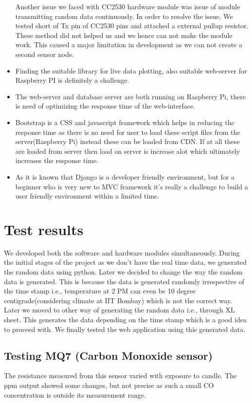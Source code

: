 \documentclass[a4paper,12pt]{article}
\begin{document}
\begin{itemize}
Another issue we faced with CC2530 hardware module was issue of module transmitting random data continuously. In order to resolve the issue, We tested short of Tx pin of CC2530 pins and attached a external pullup resistor. These method did not helped us and we hence can not make the module work. This caused a major limitation in development as we can not create a second sensor node.  



\item Finding the suitable library for live data plotting, also suitable web-server for Raspberry PI is definitely a challenge.
\item The web-server and database server are both running on Raspberry Pi, there is need of optimizing the response time of the web-interface.
\item Bootstrap is a CSS and javascript framework which helps in reducing the response time as there is no need for user to load these script files from the server(Raspberry Pi) instead these can be loaded from CDN. If at all these are loaded from server then load on server is increase alot which ultimately increases the response time.
\item As it is known that Django is a developer friendly environment, but for a beginner who is very new to MVC framework it's really a challenge to build a user friendly environment within a limited time.

\end{itemize}


\section{Test results}
\label{sec:Test_result}
We developed both the software and hardware modules simultaneously. During the initial stages of the project as we don't have the real time data, we generated the random data using python. Later we decided to change the way the random data is generated. This is because the data is generated randomly irrespective of the time stamp i.e., temperature at 2 PM can even be 10 degree centigrade(considering climate at IIT Bombay) which is not the correct way. Later we moved to other way of generating the random data i.e., through XL sheet. This generates the data depending on the time stamp which is a good idea to proceed with. We finally tested the web application using this generated data.
\subsection{Testing MQ7 (Carbon Monoxide sensor)}
The resistance measured from this sensor varied with exposure to candle. The ppm output showed some changes, but not precise as such a small CO concentration is outside its measurement range.
\end{document}
